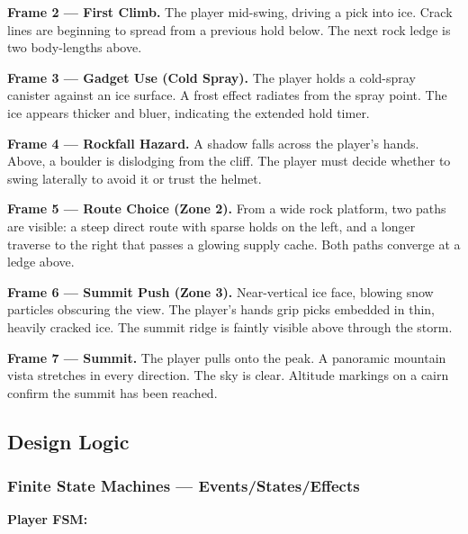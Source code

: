 \documentclass[12pt]{article}
\begin{document}
\textbf{Frame 2 --- First Climb.} The player mid-swing, driving a pick into ice. Crack lines are beginning to spread from a previous hold below. The next rock ledge is two body-lengths above.

\textbf{Frame 3 --- Gadget Use (Cold Spray).} The player holds a cold-spray canister against an ice surface. A frost effect radiates from the spray point. The ice appears thicker and bluer, indicating the extended hold timer.

\textbf{Frame 4 --- Rockfall Hazard.} A shadow falls across the player's hands. Above, a boulder is dislodging from the cliff. The player must decide whether to swing laterally to avoid it or trust the helmet.

\textbf{Frame 5 --- Route Choice (Zone 2).} From a wide rock platform, two paths are visible: a steep direct route with sparse holds on the left, and a longer traverse to the right that passes a glowing supply cache. Both paths converge at a ledge above.

\textbf{Frame 6 --- Summit Push (Zone 3).} Near-vertical ice face, blowing snow particles obscuring the view. The player's hands grip picks embedded in thin, heavily cracked ice. The summit ridge is faintly visible above through the storm.

\textbf{Frame 7 --- Summit.} The player pulls onto the peak. A panoramic mountain vista stretches in every direction. The sky is clear. Altitude markings on a cairn confirm the summit has been reached.

\subsection{Design Logic}

\subsubsection{Finite State Machines --- Events/States/Effects}


\textbf{Player FSM:}
\end{document}
